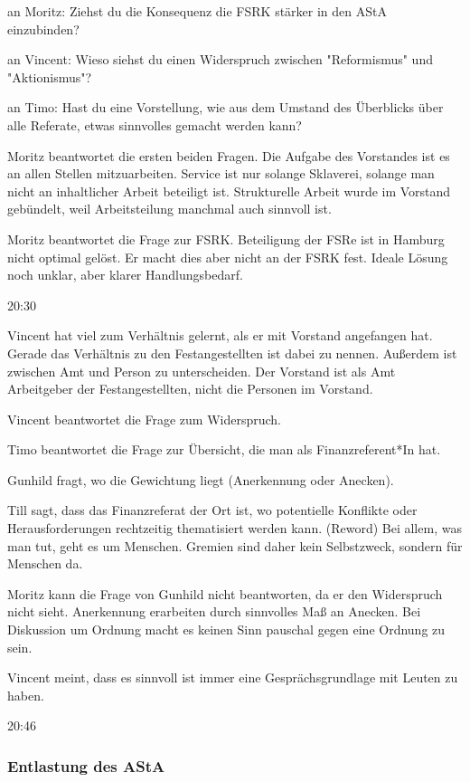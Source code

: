 \documentclass[ngerman,headheight=70pt]{scrartcl}
\begin{document}
    an Moritz: Ziehst du die Konsequenz die FSRK stärker in den AStA einzubinden?

    an Vincent: Wieso siehst du einen Widerspruch zwischen "Reformismus"
    und "Aktionismus"?

    an Timo: Hast du eine Vorstellung, wie aus dem Umstand des Überblicks
    über alle Referate, etwas sinnvolles gemacht werden kann?

    Moritz beantwortet die ersten beiden Fragen. Die Aufgabe des Vorstandes
    ist es an allen Stellen mitzuarbeiten. Service ist nur solange Sklaverei,
    solange man nicht an inhaltlicher Arbeit beteiligt ist. Strukturelle
    Arbeit wurde im Vorstand gebündelt, weil Arbeitsteilung manchmal auch
    sinnvoll ist.

    Moritz beantwortet die Frage zur FSRK. Beteiligung der FSRe ist in Hamburg
    nicht optimal gelöst. Er macht dies aber nicht an der FSRK fest. Ideale
    Lösung noch unklar, aber klarer Handlungsbedarf.

    20:30

    Vincent hat viel zum Verhältnis gelernt, als er mit Vorstand angefangen hat.
    Gerade das Verhältnis zu den Festangestellten ist dabei zu nennen.
    Außerdem ist zwischen Amt und Person zu unterscheiden. Der Vorstand ist als
    Amt Arbeitgeber der Festangestellten, nicht die Personen im Vorstand.

    Vincent beantwortet die Frage zum Widerspruch.

    Timo beantwortet die Frage zur Übersicht, die man als Finanzreferent*In
    hat.

    Gunhild fragt, wo die Gewichtung liegt (Anerkennung oder Anecken).

    Till sagt, dass das Finanzreferat der Ort ist, wo potentielle Konflikte
    oder Herausforderungen rechtzeitig thematisiert werden kann. (Reword)
    Bei allem, was man tut, geht es um Menschen. Gremien sind daher kein
    Selbstzweck, sondern für Menschen da.

    Moritz kann die Frage von Gunhild nicht beantworten, da er den Widerspruch
    nicht sieht. Anerkennung erarbeiten durch sinnvolles Maß an Anecken.
    Bei Diskussion um Ordnung macht es keinen Sinn pauschal gegen eine Ordnung
    zu sein.

    Vincent meint, dass es sinnvoll ist immer eine Gesprächsgrundlage mit
    Leuten zu haben.

    20:46

    \subsubsection{Entlastung des AStA}
\end{document}

